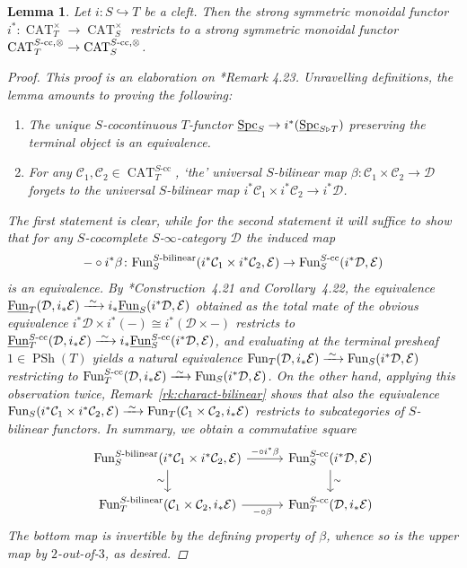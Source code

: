 \documentclass[reqno]{memo-l}
\theoremstyle{mythm}
\newtheorem{lemma}[thm]{Lemma}
\theoremstyle{definition}
\numberwithin{equation}{section}
\newcommand{\Cc}{{\mathcal{C}}}
\newcommand{\Dd}{{\mathcal{D}}}
\newcommand{\Ee}{{\mathcal{E}}}
\DeclareMathOperator{\Spc}{Spc}
\DeclareMathOperator{\CAT}{CAT}
\newcommand{\Fun}{{\textup{Fun}}}
\DeclareMathOperator{\PSh}{PSh}
\newcommand{\ulhelper}[2]{\underline{\setbox0=\hbox{$#1#2$}\dp0=0.4pt \box0\relax}}
\newcommand{\ul}[1]{{\mathpalette\ulhelper{#1}}\hbox{\rule[-2pt]{0pt}{0pt}}}
\newcommand{\iso}{\xrightarrow{\;\smash{\raisebox{-0.25ex}{\ensuremath{\scriptstyle\sim}}}\;}}
\begin{document}
\begin{lemma}\label{lemma:restr-cleft-sym-mon}
    Let $i\colon S\hookrightarrow T$ be a cleft. Then the strong symmetric monoidal functor $i^*\colon\CAT_T^\times\to\CAT_S^\times$ restricts to a strong symmetric monoidal functor $\CAT_T^{\textup{$S$-cc},\otimes}\to\CAT_S^{\textup{$S$-cc},\otimes}$.
    \begin{proof}
        This proof is an elaboration on \cite{CLL_Clefts}*{Remark 4.23}.  Unravelling definitions, the lemma amounts to proving the following:
        \begin{enumerate}
            \item The unique $S$-cocontinuous $T$-functor $\ul\Spc_S\to i^*(\ul\Spc_{S\triangleright T})$ preserving the terminal object is an equivalence.
            \item For any $\Cc_1,\Cc_2\in\CAT_T^\text{$S$-cc}$, `the' universal $S$-bilinear map $\beta\colon\Cc_1\times\Cc_2\to\Dd$ forgets to the universal $S$-bilinear map $i^*\Cc_1\times i^*\Cc_2\to i^*\Dd$.
        \end{enumerate}
        The first statement is clear, while for the second statement it will suffice to show that for any $S$-cocomplete $S$-$\infty$-category $\Dd$ the induced map 
        \[
            -\circ i^*\beta\colon\Fun_S^\text{$S$-bilinear}(i^*\Cc_1\times i^*\Cc_2,\Ee)\to\Fun_S^\text{$S$-cc}(i^*\Dd,\Ee)
        \]
        is an equivalence. By \cite{CLL_Clefts}*{Construction~4.21 and Corollary~4.22}, the equivalence $\ul\Fun_T(\Dd,i_*\Ee)\iso i_*\ul\Fun_S(i^*\Dd,\Ee)$ obtained as the total mate of the obvious equivalence $i^*\Dd\times i^*(-)\cong i^*(\Dd\times-)$ restricts to $\ul\Fun_T^\text{$S$-cc}(\Dd,i_*\Ee)\iso i_*\ul\Fun_S^\text{$S$-cc}(i^*\Dd,\Ee)$, and evaluating at the terminal presheaf $1\in\PSh(T)$ yields a natural equivalence $\Fun_T(\Dd,i_*\Ee)\iso \Fun_S(i^*\Dd,\Ee)$ restricting to $\Fun_T^\text{$S$-cc}(\Dd,i_*\Ee)\iso \Fun_S(i^*\Dd,\Ee)$. On the other hand, applying this observation twice, Remark~\ref{rk:charact-bilinear} shows that also the equivalence $\Fun_S(i^*\Cc_1\times i^*\Cc_2,\Ee)\iso\Fun_T(\Cc_1\times\Cc_2,i_*\Ee)$ restricts to subcategories of $S$-bilinear functors. In summary, we obtain a commutative square
        \[
            \begin{tikzcd}
                 \Fun_S^\text{$S$-bilinear}(i^*\Cc_1\times i^*\Cc_2,\Ee)\arrow[r,"-\circ i^*\beta"]\arrow[d,"\sim"'] &[.5em] \Fun_S^\text{$S$-cc}(i^*\Dd,\Ee)\arrow[d,"\sim"]\\[-.05ex]
                 \Fun_T^\text{$S$-bilinear}(\Cc_1\times \Cc_2,i_*\Ee)\arrow[r,"-\circ\beta"'] & \Fun_T^\text{$S$-cc}(\Dd,i_*\Ee)
            \end{tikzcd}
        \]
        The bottom map is invertible by the defining property of $\beta$, whence so is the upper map by $2$-out-of-$3$, as desired.
    \end{proof}
\end{lemma}
\end{document}
